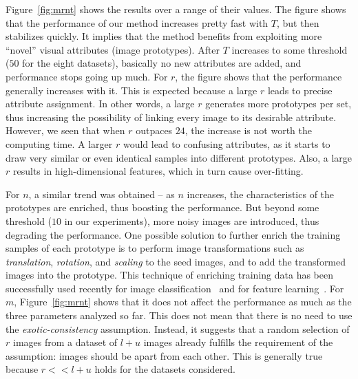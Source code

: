 \documentclass[preprint,12pt,3p]{elsarticle}
\begin{document}
Figure~\ref{fig:mrnt} shows the results over a range of their
values. The figure shows that the performance of our method increases
pretty fast with $T$, but then stabilizes quickly. It implies that the
method benefits from exploiting more ``novel'' visual attributes
(image prototypes). After $T$ increases to some threshold (\eg $50$
for the eight datasets), basically no new attributes are added, and performance stops going up much. 
For $r$, the
figure shows that the performance generally increases with it. This is
expected because a large $r$ leads to precise attribute
assignment. In other words, a large $r$ generates more
prototypes per set, thus increasing the possibility of linking every
image to its desirable attribute.  However, we seen that when $r$
outpaces $24$, the increase is not worth the computing time. A larger
$r$ would lead to confusing attributes, as it starts to draw very
similar or even identical samples into different prototypes.  Also, a
large $r$ results in high-dimensional features, which in turn
cause over-fitting. 

For $n$, a similar trend was obtained -- as $n$ increases, the
characteristics of the prototypes are enriched, thus boosting the
performance. But beyond some threshold (\eg $10$ in our experiments),
more noisy images are introduced, thus degrading the performance. One
possible solution to further enrich the training samples of each
prototype is to perform image transformations such as
\emph{translation}, \emph{rotation}, and \emph{scaling} to the seed
images, and to add the transformed images into the prototype. This
technique of enriching training data has been successfully used
recently for image classification~\citep{transformation:cvpr14} and for feature learning~\citep{cnnfet14}.  For $m$, Figure~\ref{fig:mrnt} shows
that it does not affect the performance as much as the three parameters
analyzed so far. This does not mean that there is no need to use the
\emph{exotic-consistency} assumption. Instead, it suggests that a
random selection of $r$ images from a dataset of $l+u$ images already
fulfills the requirement of the assumption: images should be apart
from each other.  This is generally true because $r << l+u$ holds for
the datasets considered.
  

\end{document}

